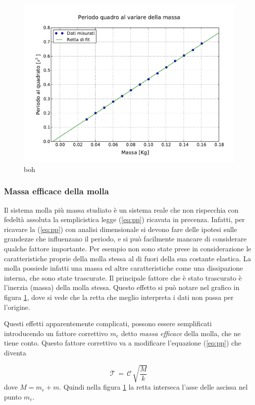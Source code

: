 \begin{figure}
    \centering
    \includegraphics[width=120mm]{immagini/periodo2_massa.pdf}
    \caption{boh}
    \label{fig:periodo2_massa}
\end{figure}

\subsubsection{Massa efficace della molla}

Il sistema molla più massa studiato è un sistema reale che non rispecchia con fedeltà assoluta la semplicistica
legge (\ref{eq:pp}) ricavata in precenza. Infatti, per ricavare la (\ref{eq:pp}) con analisi dimensionale
si devono fare delle ipotesi sulle grandezze che influenzano il periodo, e si può facilmente mancare di considerare qualche
fattore importante. Per esempio non sono state prese in considerazione le caratteristiche proprie della molla stessa
al di fuori della sua costante elastica. La molla possiede infatti una massa ed altre caratteristiche
come una dissipazione interna, che sono state trascurate. Il principale fattore che è stato trascurato
è l'inerzia (massa) della molla stessa. Questo effetto si può notare nel grafico in figura \ref{fig:periodo2_massa},
dove si vede che la retta che meglio interpreta i dati non passa per l'origine.

Questi effetti apparentemente complicati, possono essere semplificati introducendo un fattore correttivo $m_e$ detto
\emph{massa efficace} della molla, che ne tiene conto. Questo fattore correttivo va a modificare l'equazione (\ref{eq:pp}) che diventa

\begin{equation}
    \mathcal{T} \, = \, \mathcal{C} \, \sqrt{\frac{M}{k}}
    \label{eq:ppme}
\end{equation}
%
dove $M = m_e + m$. Quindi nella figura \ref{fig:periodo2_massa} la retta interseca l'asse delle ascissa
nel punto $m_e$.

